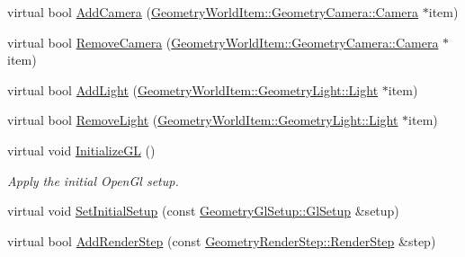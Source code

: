 \begin{DoxyCompactItemize}
\item 
virtual bool \mbox{\hyperlink{class_geometry_engine_1_1_geometry_scene_1_1_geometry_scene_af93678aaffba19dfb2302a9b2850ae59}{Add\+Camera}} (\mbox{\hyperlink{class_geometry_engine_1_1_geometry_world_item_1_1_geometry_camera_1_1_camera}{Geometry\+World\+Item\+::\+Geometry\+Camera\+::\+Camera}} $\ast$item)
\item 
virtual bool \mbox{\hyperlink{class_geometry_engine_1_1_geometry_scene_1_1_geometry_scene_ae5607835364c78780386efb5dbde3fff}{Remove\+Camera}} (\mbox{\hyperlink{class_geometry_engine_1_1_geometry_world_item_1_1_geometry_camera_1_1_camera}{Geometry\+World\+Item\+::\+Geometry\+Camera\+::\+Camera}} $\ast$item)
\item 
virtual bool \mbox{\hyperlink{class_geometry_engine_1_1_geometry_scene_1_1_geometry_scene_adde250133889e145473064d276e96583}{Add\+Light}} (\mbox{\hyperlink{class_geometry_engine_1_1_geometry_world_item_1_1_geometry_light_1_1_light}{Geometry\+World\+Item\+::\+Geometry\+Light\+::\+Light}} $\ast$item)
\item 
virtual bool \mbox{\hyperlink{class_geometry_engine_1_1_geometry_scene_1_1_geometry_scene_ab0217afe0c403087d3be028f012b1125}{Remove\+Light}} (\mbox{\hyperlink{class_geometry_engine_1_1_geometry_world_item_1_1_geometry_light_1_1_light}{Geometry\+World\+Item\+::\+Geometry\+Light\+::\+Light}} $\ast$item)
\item 
\mbox{\label{class_geometry_engine_1_1_geometry_scene_1_1_geometry_scene_a604e2c95f3b17ec14b637fb2829d23e0}} 
virtual void \mbox{\hyperlink{class_geometry_engine_1_1_geometry_scene_1_1_geometry_scene_a604e2c95f3b17ec14b637fb2829d23e0}{Initialize\+GL}} ()
\begin{DoxyCompactList}\small\item\em Apply the initial Open\+Gl setup. \end{DoxyCompactList}\item 
virtual void \mbox{\hyperlink{class_geometry_engine_1_1_geometry_scene_1_1_geometry_scene_a3c873554ae0898335d397d90aa2d25c3}{Set\+Initial\+Setup}} (const \mbox{\hyperlink{class_geometry_engine_1_1_geometry_gl_setup_1_1_gl_setup}{Geometry\+Gl\+Setup\+::\+Gl\+Setup}} \&setup)
\item 
virtual bool \mbox{\hyperlink{class_geometry_engine_1_1_geometry_scene_1_1_geometry_scene_ada6f2a88a6e7962200a12e5083f8c055}{Add\+Render\+Step}} (const \mbox{\hyperlink{class_geometry_engine_1_1_geometry_render_step_1_1_render_step}{Geometry\+Render\+Step\+::\+Render\+Step}} \&step)

\end{DoxyCompactItemize}
